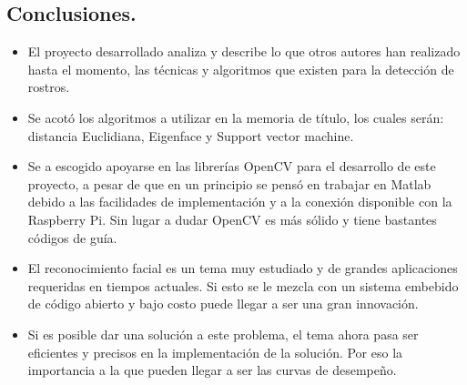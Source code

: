\documentclass[letterpaper,12pt]{article}
\newcommand{\compresslist}{ %
\setlength{\itemsep}{1pt}
\setlength{\parskip}{0pt}
\setlength{\parsep}{0pt}
}
\begin{document}
\subsection{Conclusiones.}
\begin{itemize}\compresslist
\item El proyecto desarrollado analiza y describe lo que otros autores han realizado hasta el momento, las técnicas y algoritmos que existen para la detección de rostros.
\item Se acotó los algoritmos a utilizar en la memoria de título, los cuales serán: distancia Euclidiana, Eigenface y Support vector machine.
\item Se a escogido apoyarse en las librerías OpenCV para el desarrollo de este proyecto, a pesar de que en un principio se pensó en trabajar en Matlab debido a las facilidades de implementación y a la conexión disponible con la Raspberry Pi. Sin lugar a dudar OpenCV es más sólido y tiene bastantes códigos de guía.
\item El reconocimiento facial es un tema muy estudiado y de grandes aplicaciones requeridas en tiempos actuales. Si esto se le mezcla con un sistema embebido de código abierto y bajo costo puede llegar a ser una gran innovación.
\item Si es posible dar una solución a este problema, el tema ahora pasa ser eficientes y precisos en la implementación de la solución. Por eso la importancia a la que pueden llegar a ser las curvas de desempeño.

\end{itemize}


\end{document}
